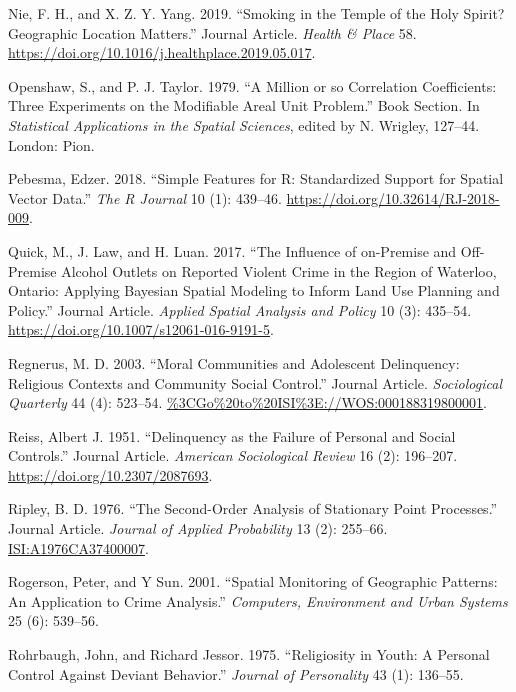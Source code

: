 \documentclass[smallextended]{svjour3}       %
\begin{document}
\leavevmode\hypertarget{ref-Nie2019smoking}{}%
Nie, F. H., and X. Z. Y. Yang. 2019. ``Smoking in the Temple of the Holy
Spirit? Geographic Location Matters.'' Journal Article. \emph{Health \&
Place} 58. \url{https://doi.org/10.1016/j.healthplace.2019.05.017}.

\leavevmode\hypertarget{ref-Openshaw1979million}{}%
Openshaw, S., and P. J. Taylor. 1979. ``A Million or so Correlation
Coefficients: Three Experiments on the Modifiable Areal Unit Problem.''
Book Section. In \emph{Statistical Applications in the Spatial
Sciences}, edited by N. Wrigley, 127--44. London: Pion.

\leavevmode\hypertarget{ref-Pebesma2018simple}{}%
Pebesma, Edzer. 2018. ``Simple Features for R: Standardized Support for
Spatial Vector Data.'' \emph{The R Journal} 10 (1): 439--46.
\url{https://doi.org/10.32614/RJ-2018-009}.

\leavevmode\hypertarget{ref-Quick2017influence}{}%
Quick, M., J. Law, and H. Luan. 2017. ``The Influence of on-Premise and
Off-Premise Alcohol Outlets on Reported Violent Crime in the Region of
Waterloo, Ontario: Applying Bayesian Spatial Modeling to Inform Land Use
Planning and Policy.'' Journal Article. \emph{Applied Spatial Analysis
and Policy} 10 (3): 435--54.
\url{https://doi.org/10.1007/s12061-016-9191-5}.

\leavevmode\hypertarget{ref-Regnerus2003moral}{}%
Regnerus, M. D. 2003. ``Moral Communities and Adolescent Delinquency:
Religious Contexts and Community Social Control.'' Journal Article.
\emph{Sociological Quarterly} 44 (4): 523--54.
\url{\%3CGo\%20to\%20ISI\%3E://WOS:000188319800001}.

\leavevmode\hypertarget{ref-Reiss1951delinquency}{}%
Reiss, Albert J. 1951. ``Delinquency as the Failure of Personal and
Social Controls.'' Journal Article. \emph{American Sociological Review}
16 (2): 196--207. \url{https://doi.org/10.2307/2087693}.

\leavevmode\hypertarget{ref-Ripley1976second}{}%
Ripley, B. D. 1976. ``The Second-Order Analysis of Stationary Point
Processes.'' Journal Article. \emph{Journal of Applied Probability} 13
(2): 255--66. \url{ISI:A1976CA37400007}.

\leavevmode\hypertarget{ref-Rogerson2001spatial}{}%
Rogerson, Peter, and Y Sun. 2001. ``Spatial Monitoring of Geographic
Patterns: An Application to Crime Analysis.'' \emph{Computers,
Environment and Urban Systems} 25 (6): 539--56.

\leavevmode\hypertarget{ref-Rohrbaugh1975religiosity}{}%
Rohrbaugh, John, and Richard Jessor. 1975. ``Religiosity in Youth: A
Personal Control Against Deviant Behavior.'' \emph{Journal of
Personality} 43 (1): 136--55.
\end{document}
